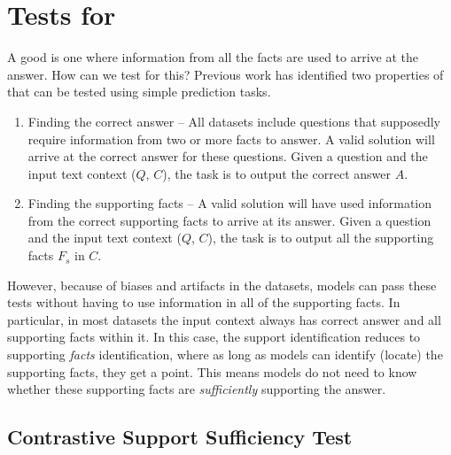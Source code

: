 \section{Tests for \MfR}
A good \mfr is one where information from all the facts are used to arrive at the answer. How can we test for this? Previous work has identified two properties of \mfr that can be tested using simple prediction tasks. 

\begin{enumerate}
\item Finding the correct answer -- All \mf datasets include questions that supposedly require information from two or more facts to answer. A valid \mfr solution will arrive at the correct answer for these questions. Given a question and the input text context ($Q$, $C$), the task is to output the correct answer $A$. 

\item Finding the supporting facts -- A valid \mfr solution will have used information from the correct supporting facts to arrive at its answer. Given a question and the input text context ($Q$, $C$), the task is to output all the supporting facts $F_s$ in $C$.
\end{enumerate}

However, because of biases and artifacts in the datasets, models can pass these tests without having to use information in all of the supporting facts. In particular, in most \mf datasets the input context always has correct answer and all supporting facts within it. In this case, the support identification reduces to supporting \textit{facts} identification, where as long as models can identify (locate) the supporting facts, they get a point. This means models do not need to know whether these supporting facts are {\em sufficiently} supporting the answer. 

\subsection{Contrastive Support Sufficiency Test}



